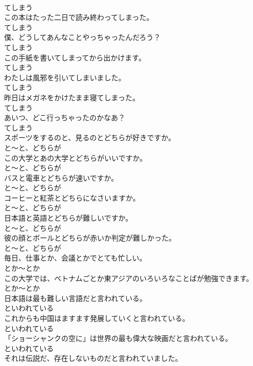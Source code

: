 \documentclass[8pt]{extreport}
\begin{document}
\begin{CJK}{UTF8}{min}
\\	てしまう	
\\	この本はたった二日で読み終わってしまった。	
\\	てしまう	
\\	僕、どうしてあんなことやっちゃったんだろう？	
\\	てしまう	
\\	この手紙を書いてしまってから出かけます。	
\\	てしまう	
\\	わたしは風邪を引いてしまいました。	
\\	てしまう	
\\	昨日はメガネをかけたまま寝てしまった。	
\\	てしまう	
\\	あいつ、どこ行っちゃったのかなあ？	
\\	てしまう	
\\	スポーツをするのと、見るのとどちらが好きですか。	
\\	と～と、どちらが	
\\	この大学とあの大学とどちらがいいですか。	
\\	と～と、どちらが	
\\	バスと電車とどちらが速いですか。	
\\	と～と、どちらが	
\\	コーヒーと紅茶とどちらになさいますか。	
\\	と～と、どちらが	
\\	日本語と英語とどちらが難しいですか。	
\\	と～と、どちらが	
\\	彼の顔とボールとどちらが赤いか判定が難しかった。	
\\	と～と、どちらが	
\\	毎日、仕事とか、会議とかでとても忙しい。	
\\	とか～とか	
\\	この大学では、ベトナムごとか東アジアのいろいろなことばが勉強できます。	
\\	とか～とか	
\\	日本語は最も難しい言語だと言われている。	
\\	といわれている	
\\	これからも中国はますます発展していくと言われている。	
\\	といわれている	
\\	「ショーシャンクの空に」は世界の最も偉大な映画だと言われている。	
\\	といわれている	
\\	それは伝説だ、存在しないものだと言われていました。	

\end{CJK}
\end{document}
